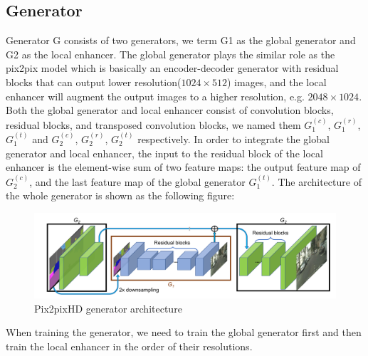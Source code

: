 \subsection{Generator}
Generator G consists of two generators, we term G1 as the global generator and G2 as 
the local enhancer. The global generator plays the similar role as the pix2pix model 
which is basically an encoder-decoder generator with residual blocks that can output 
lower resolution($1024 \times 512$) images, and the local enhancer will augment the 
output images to a higher resolution, e.g. $2048 \times 1024$. Both the global generator 
and local enhancer consist of convolution blocks, residual blocks, and transposed convolution blocks,
we named them $G_{1}^{(c)}$, $G_{1}^{(r)}$, $G_{1}^{(t)}$ and $G_{2}^{(c)}$, $G_{2}^{(r)}$, 
$G_{2}^{(t)}$ respectively. In order to integrate the global generator and local enhancer, 
the input to the residual block of the local enhancer is the 
element-wise sum of two feature maps: the output feature map of $G_{2}^{(c)}$, and the last 
feature map of the global generator $G_{1}^{(t)}$. The architecture of the whole generator 
is shown as the following figure:
\begin{figure}[H]
    \begin{center}
    \includegraphics[width=12cm]{figures/pix2pixHD-generator}
    \end{center}
    \caption{Pix2pixHD generator architecture}
    \label{fig:pix2pixHD-generator}
\end{figure}
When training the generator, we need to train the global generator first and then train the 
local enhancer in the order of their resolutions.


